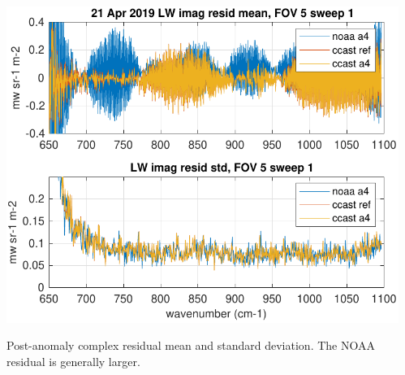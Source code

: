 \documentclass[10pt]{beamer}
\begin{document}
\begin{frame}
\begin{columns}[t]
\begin{column}{0.5\textwidth}
\end{column}
\begin{column}{0.5\textwidth}  
  \begin{centering}
  \includegraphics[width=\textwidth]{figures/LW_post_fail_imag_fov5_sd1.pdf}
  \end{centering}\vspace{3mm}
  Post-anomaly complex residual mean and standard deviation.  The
  NOAA residual is generally larger.

\end{column}
\end{columns}
\end{frame}
\end{document}
